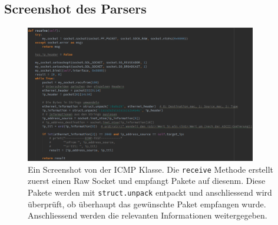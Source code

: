 \documentclass{article} %
\begin{document}
\subsection{Screenshot des Parsers}
\begin{figure}[!htb]
\begin{center}
\includegraphics[width=0.9\textwidth]{data/probereceiver.png}
\captionsetup{singlelinecheck=off}
\caption[Titel]{
Ein Screenshot von der ICMP Klasse. Die \texttt{receive} Methode erstellt zuerst einen Raw Socket und empfangt Pakete auf diesenm. Diese Pakete werden mit \texttt{struct.unpack} entpackt und anschliessend wird \"uberpr\"uft, ob \"uberhaupt das gew\"unschte Paket empfangen wurde. Anschliessend werden die relevanten Informationen weitergegeben.
}%
\label{Abb.54}
\end{center}
\end{figure}
\end{document}
